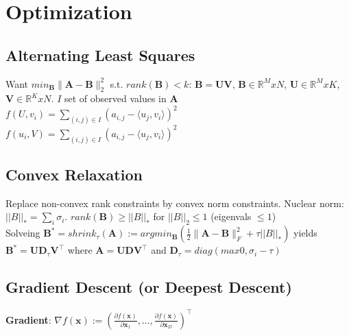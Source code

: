 \section{Optimization}

\subsection*{Alternating Least Squares}
Want $min_\mathbf{B}\|\mathbf{A} - \mathbf{B}\|^2_2 $ s.t. $rank(\mathbf{B}) < k$: $\mathbf{B}=\mathbf{UV}$, $\mathbf{B} \in \mathbb{R}^MxN$, $\mathbf{U} \in \mathbb{R}^MxK$, $\mathbf{V} \in \mathbb{R}^KxN$. $I$ set of observed values in $\mathbf{A}$\\
$f(U,v_i)=\sum_{(i,j)\in I} (a_{i,j} - \langle u_j, v_i \rangle)^2$\\
$f(u_i,V)=\sum_{(i,j)\in I} (a_{i,j} - \langle u_j, v_i \rangle)^2$\\


\subsection*{Convex Relaxation}
Replace non-convex rank constraints by convex norm constraints. Nuclear norm: $||B||_* = \sum_i \sigma_i$. $rank(\mathbf{B}) \geq ||B||_*$ for $||B||_2 \leq 1$ (eigenvals $\leq 1$)\\
Solveing $\mathbf{B}^* = shrink_\tau(\mathbf{A}) := argmin_\mathbf{B}(\frac{1}{2}\|\mathbf{A} - \mathbf{B}\|^2_F + \tau||B||_*)$ yields $\mathbf{B}^* = \mathbf{U}\mathbf{D}_\tau\mathbf{V}^\top$ where $\mathbf{A} = \mathbf{UDV}^\top $ and $\mathbf{D}_\tau = diag(max{0, \sigma_i - \tau})$

\subsection*{Gradient Descent (or Deepest Descent)}
\textbf{Gradient}: $\nabla f(\mathbf{x}) := \left( \frac{\partial f(\mathbf{x})}{\partial \mathbf{x}_1}, \ldots, \frac{\partial f(\mathbf{x})}{\partial \mathbf{x}_D} \right)^\top$

